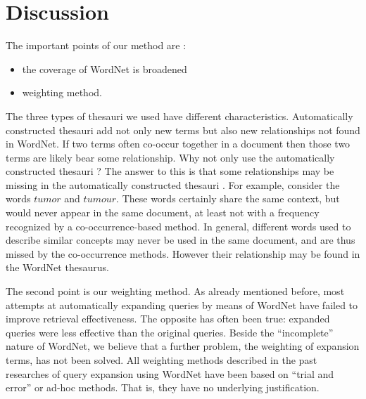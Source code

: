\section{Discussion}
The important points of our method are :

\begin{itemize}
\item the coverage of WordNet is broadened
\item weighting method.
\end{itemize}

The three types of thesauri we used have different characteristics. 
Automatically constructed\break
 thesauri add not only new terms but also new
relationships not found in  WordNet.  If two terms often
co-occur together in a document then those two terms are likely bear some 
relationship. Why not only use the automatically constructed thesauri ?
The answer to this is that some relationships may be missing in the automatically
constructed thesauri \cite{grefenstette94}. For example, consider the words $tumor$ and
$tumour$. These words certainly share the same context, but would never
appear in the same document, at least not with a frequency 
recognized by a co-occurrence-based method. In general, different words
used to describe similar concepts may never be used in the same
document, and are thus missed by the co-occurrence methods. However their 
relationship may be found in the WordNet thesaurus. 

The second point is our weighting method.  As already mentioned before,
most attempts at automatically expanding queries by means of  WordNet
have failed to improve  retrieval effectiveness. The opposite has  often 
been true: expanded queries were less effective than the original queries.
Beside the ``incomplete'' nature of  WordNet, we believe that a further
problem, the weighting of  expansion terms, has not been solved. All
weighting methods described in the past researches of  query expansion
using WordNet have been  based on
``trial and error'' or ad-hoc methods.  That is, they have no underlying 
justification.

